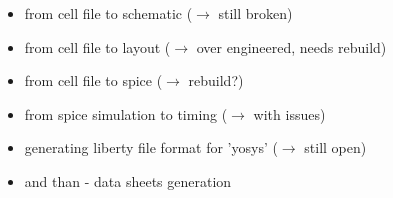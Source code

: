 \documentclass[aspectratio=169]{beamer}
\begin{document}

\begin{frame}
    \begin{itemize}
        \item from cell file to schematic ($\rightarrow$ still broken)
        \item from cell file to layout ($\rightarrow$ over engineered, needs rebuild)
        \item from cell file to spice ($\rightarrow$ rebuild?)
        \item from spice simulation to timing ($\rightarrow$ with issues)
        \item generating liberty file format for 'yosys' ($\rightarrow$ still open)
        \item and than - data sheets generation
    \end{itemize}
\end{frame}
\end{document}

